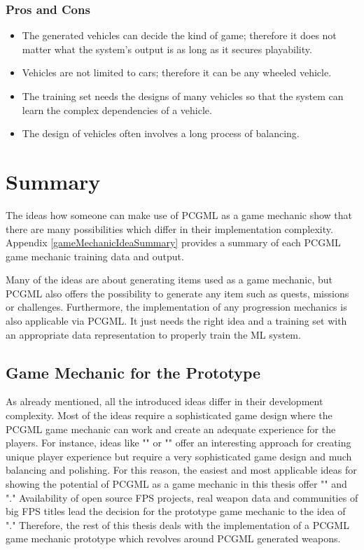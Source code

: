\documentclass[MGS,Master,english]{twbook}%
\begin{document}
\subsubsection{Pros and Cons}
\begin{itemize}
	\item The generated vehicles can decide the kind of game; therefore it does not matter what the system's output is as long as it secures playability.
	\item Vehicles are not limited to cars; therefore it can be any wheeled vehicle.
	\item The training set needs the designs of many vehicles so that the system can learn the complex dependencies of a vehicle.
	\item The design of vehicles often involves a long process of balancing.
\end{itemize}

\section{Summary}
The ideas how someone can make use of PCGML as a game mechanic show that there are many possibilities which differ in their implementation complexity. Appendix \ref{gameMechanicIdeaSummary} provides a summary of each PCGML game mechanic training data and output.

Many of the ideas are about generating items used as a game mechanic, but PCGML also offers the possibility to generate any item such as quests, missions or challenges. Furthermore, the implementation of any progression mechanics is also applicable via PCGML. It just needs the right idea and a training set with an appropriate data representation to properly train the ML system.

\subsection{Game Mechanic for the Prototype}
As already mentioned, all the introduced ideas differ in their development complexity. Most of the ideas require a sophisticated game design where the PCGML game mechanic can work and create an adequate experience for the players. For instance, ideas like "" or "" offer an interesting approach for creating unique player experience but require a very sophisticated game design and much balancing and polishing. For this reason, the easiest and most applicable ideas for showing the potential of PCGML as a game mechanic in this thesis offer "" and "." Availability of open source FPS projects, real weapon data and communities of big FPS titles lead the decision for the prototype game mechanic to the idea of "." Therefore, the rest of this thesis deals with the implementation of a PCGML game mechanic prototype which revolves around PCGML generated weapons.
\end{document}
